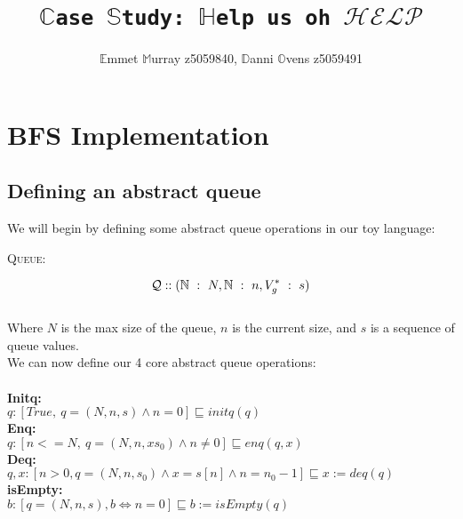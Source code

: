 \documentclass[a4paper]{scrartcl}
\title{\texttt{$\mathbb{C}$ase $\mathbb{S}$tudy: $\mathbb{H}$elp us oh $\mathcal{HELP}$}}
\author{$\mathbb{E}$mmet $\mathbb{M}$urray z5059840, $\mathbb{D}$anni $\mathbb{O}$vens z5059491}
\newcommand{\N}{\mathbb{N}}
\newcommand{\refinedby}{\sqsubseteq} %
\begin{document}
\maketitle
\section{BFS Implementation}
%
\subsection{Defining an abstract queue}
We will begin by defining some abstract queue operations in our toy language: \\
\begin{center}
{\LARGE{\textsc{Queue:}}\normalsize}
\end{center}
\begin{equation*}
\mathcal{Q} :: ( \N~:~N, \N~:~n, V_{g}^{*}~:~s ) \\
\end{equation*} \\
%
Where $N$ is the max size of the queue, $n$ is the current size, and $s$ is a sequence of queue values. \\
%
We can now define our 4 core abstract queue operations: \\ \\
%
\textbf{Initq:} \\
$q : [True, ~ q = ( N, n, s) \land n = 0] \refinedby initq(q)$ \\
\textbf{Enq:} \\
$q : [n <= N, ~ q = ( N, n, xs_0) \land n \neq 0] \refinedby enq(q, x)$ \\
\textbf{Deq:} \\
$q,x : [n > 0, q = (N, n, s_0) \land x = s[n] \land n = n_0 - 1] \refinedby x := deq(q)$ \\
\textbf{isEmpty:} \\
$b : [q = (N, n, s), b \iff n = 0 ] \refinedby b := isEmpty(q)$\\
%
\end{document}
